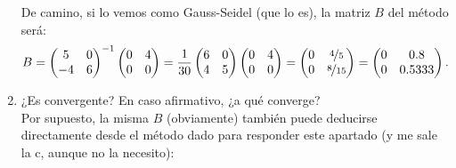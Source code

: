 \documentclass[12pt]{article}
\begin{document}
\begin{ejercicio}[3 puntos]
\begin{enumerate}[label=\alph*)]
				De camino, si lo vemos como Gauss-Seidel (que lo es), la matriz $B$ del método será:
				$$B = 
				\begin{pmatrix}
					5 & 0 \\
					-4 & 6
				\end{pmatrix}^{-1}
				\begin{pmatrix}
					0 & 4 \\
					0 & 0
				\end{pmatrix}
				= \frac{1}{30}
				\begin{pmatrix}
					6 & 0 \\
					4 & 5
				\end{pmatrix}
				\begin{pmatrix}
					0 & 4 \\
					0 & 0
				\end{pmatrix}
				= 
				\begin{pmatrix}
					0 & \nicefrac{4}{5} \\
					0 & \nicefrac{8}{15}
				\end{pmatrix}
				= 
				\begin{pmatrix}
					0 & 0.8 \\
					0 & 0.5333
				\end{pmatrix}.$$
				
			
			\item ¿Es convergente? En caso afirmativo, ¿a qué converge? \\
			
				Por supuesto, la misma $B$ (obviamente) también puede deducirse directamente desde el método dado para responder este apartado (y me sale la c, aunque no la necesito):
				

\end{enumerate}
\end{ejercicio}
\end{document}

